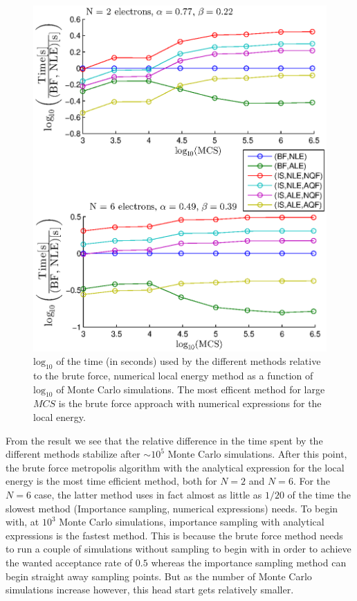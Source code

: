 \begin{figure}[h!]
	\centering 
	\includegraphics[width=\textwidth]{results/times.eps}
	\caption{$\textrm{log}_{10}$ of the time (in seconds) used by the different methods relative to the brute force, numerical local energy method as a function of $\textrm{log}_{10}$ of Monte Carlo simulations.
	The most efficent method for large $MCS$ is the brute force approach with numerical expressions for the local energy. }
	\label{fig:res_times}
\end{figure}

From the result we see that the relative difference in the time spent by the different methods stabilize after $\sim 10^5$ Monte Carlo simulations. 
After this point, the brute force metropolis algorithm with the analytical expression for the local energy is the most time efficient method, both for $N=2$ and $N=6$.
For the $N=6$ case, the latter method uses in fact almost as little as $1/20$ of the time the slowest method (Importance sampling, numerical expressions) needs. 
To begin with, at $10^3$ Monte Carlo simulations, importance sampling with analytical expressions is the fastest method.
This is because the brute force method needs to run a couple of simulations without sampling to begin with in order to achieve the wanted acceptance rate of $0.5$ whereas the importance sampling method can begin straight away sampling points. 
But as the number of Monte Carlo simulations increase however, this head start gets relatively smaller. 

